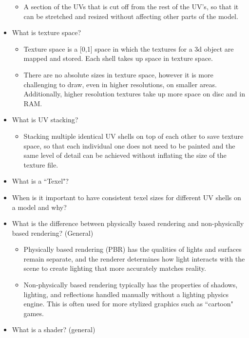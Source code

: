 \documentclass{article}
\begin{document}
\begin{itemize}
    \begin{itemize}
        \item A section of the UVs that is cut off from the rest of the UV's, so that it can be stretched and resized without affecting other parts of the model.
    \end{itemize}
    \item What is texture space?
    \begin{itemize}
        \item Texture space is a [0,1] space in which the textures for a 3d object are mapped and stored. Each shell takes up space in texture space.
        \item There are no absolute sizes in texture space, however it is more challenging to draw, even in higher resolutions, on smaller areas. Additionally, higher resolution textures take up more space on disc and in RAM.
    \end{itemize}
    \item What is UV stacking?
    \begin{itemize}
        \item Stacking multiple identical UV shells on top of each other to save texture space, so that each individual one does not need to be painted and the same level of detail can be achieved without inflating the size of the texture file.
    \end{itemize}
    \item What is a ``Texel"?
    \item When is it important to have consistent texel sizes for different UV shells on a model and why?
    \item What is the difference between physically based rendering and non-physically based rendering? (General)
    \begin{itemize}
        \item Physically based rendering (PBR) has the qualities of lights and surfaces remain separate, and the renderer determines how light interacts with the scene to create lighting that more accurately matches reality.
        \item Non-physically based rendering typically has the properties of shadows, lighting, and reflections handled manually without a lighting physics engine. This is often used for more stylized graphics such as ``cartoon" games.
    \end{itemize}
     \item What is a shader? (general)
    \begin{itemize}

\end{itemize}
\end{itemize}
\end{document}

